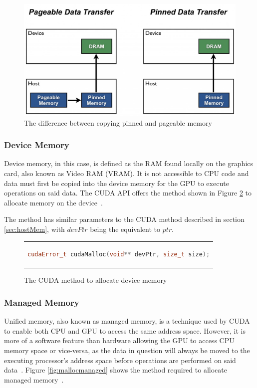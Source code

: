  \begin{figure}[htpb]
 	\includegraphics[width = \linewidth]{figures/datatransfer}
	\caption{The difference between copying pinned and pageable memory~\cite{nvidia_how_2012}}
 	\label{fig:memcopy}
 \end{figure}
 
 \subsubsection{Device Memory}
 \label{sec:devMem}
 Device memory, in this case, is defined as the RAM found locally on the graphics card, also known as Video RAM (VRAM). It is not accessible to CPU code and data must first be copied into the device memory for the GPU to execute operations on said data. The CUDA API offers the method shown in Figure \ref{fig:cudamalloc} to allocate memory on the device~\cite{nvidia_cuda_2022-1}.
 
 The method has similar parameters to the CUDA method described in section \ref{sec:hostMem}, with $devPtr$ being the equivalent to $ptr$. 
 
 \begin{figure}[htpb]
 	\centering
 	\begin{tabular}{c}
 		\begin{lstlisting}[language=C++]
 			cudaError_t cudaMalloc(void** devPtr, size_t size);
 		\end{lstlisting}
 	\end{tabular}
 	\caption[CUDA device memory allocation]{The CUDA method to allocate device memory~\cite{nvidia_cuda_2022-1}}
 	\label{fig:cudamalloc}
 \end{figure}

 
 \subsubsection{Managed Memory}
 \label{sec:manMem}
 Unified memory, also known as managed memory, is a technique used by CUDA to enable both CPU and GPU to access the same address space. However, it is more of a software feature than hardware allowing the GPU to access CPU memory space or vice-versa, as the data in question will always be moved to the executing processor's address space before operations are performed on said data~\cite{nvidia_unified_2017}. Figure \ref{fig:mallocmanaged} shows the method required to allocate managed memory~\cite{nvidia_cuda_2022-1}.
 
